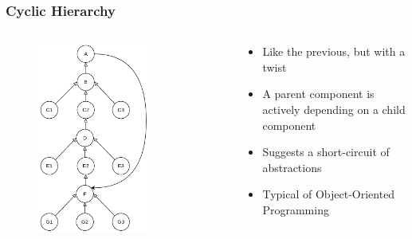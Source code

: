 \documentclass[dvipsnames, 10pt]{beamer}
\begin{document}
\begin{frame}
  \frametitle{Cyclic Hierarchy}
  \begin{columns}
    \begin{column}{0.5\textwidth}
      \begin{figure}
        \begin{center}
          \includegraphics[width=0.7\textwidth]{figures/architectural-smells/cyclic-hierarchy.png}
        \end{center}
      \end{figure}
    \end{column}
    \begin{column}{0.5\textwidth}
      \begin{itemize}
        \item Like the previous, but with a twist
        \item A parent component is actively depending on a child component
        \item Suggests a short-circuit of abstractions
        \item Typical of Object-Oriented Programming
      \end{itemize}
    \end{column}
  \end{columns}
\end{frame}
\end{document}
